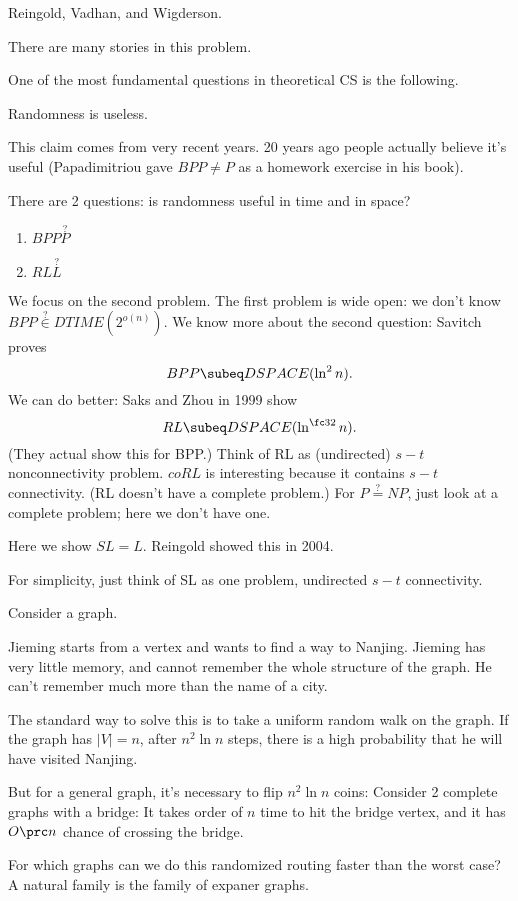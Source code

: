 
Reingold, Vadhan, and Wigderson.

There are many stories in this problem.

One of the most fundamental questions in theoretical CS is the following.
\begin{clm}
Randomness is useless.
\end{clm}
This claim comes from very recent years. 20 years ago people actually believe it's useful (Papadimitriou gave $BPP\ne P$ as a homework exercise in his book).

There are 2 questions: is randomness useful in time and in space?
\begin{enumerate}
\item
$BPP\stackrel ? P$
\item
$RL\stackrel ? L$
\end{enumerate}
We focus on the second problem. The first problem is wide open: we don't know $BPP\stackrel?{\in}DTIME(2^{o(n)})$. We know more about the second question: Savitch proves
\[
BPP\subeq DSPACE(\ln^2n).
\]
We can do better: Saks and Zhou in 1999 show 
\[
RL\subeq DSPACE(\ln^{\fc 32}n).
\]
(They actual show this for BPP.)
Think of RL as (undirected) $s-t$ nonconnectivity problem. $coRL$ is interesting because it contains $s-t$ connectivity. (RL doesn't have a complete problem.) For $P\stackrel?=NP$, just look at a complete problem; here we don't have one.

Here we show $SL=L$. Reingold showed this in 2004. 

For simplicity, just think of SL as one problem, undirected $s-t$ connectivity.

Consider a graph. 


Jieming starts from a vertex and wants to find a way to Nanjing. Jieming has very little memory, and cannot remember the whole structure of the graph. He can't remember much more than the name of a city.

The standard way to solve this is to take a uniform random walk on the graph. If the graph has $|V|=n$, after $n^2\ln n$ steps, there is a high probability that he will have visited Nanjing.

But for a general graph, it's necessary to flip $n^2\ln n$ coins: Consider 2 complete graphs with a bridge: It takes order of $n$ time to hit the bridge vertex, and it has $O\prc n$ chance of crossing the bridge.

For which graphs can we do this randomized routing faster than the worst case? A natural family is the family of expaner graphs.

